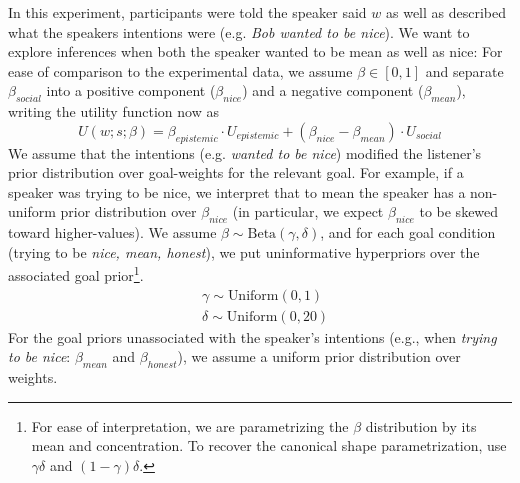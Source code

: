 \documentclass[10pt,letterpaper]{article}
\newcommand{\ndg}[1]{\textcolor{Green}{[ndg: #1]}}
\begin{document}
In this experiment, participants were told the speaker said $w$ as well as described what the speakers intentions were (e.g. \emph{Bob wanted to be nice}). 
We want to explore inferences when both the speaker wanted to be mean as well as nice: For ease of comparison to the experimental data, we assume $\beta \in [0,1]$ and separate $\beta_{social}$ into a positive component ($\beta_{nice}$) and a negative component ($\beta_{mean}$), writing the utility function now as
$$
 U(w;s; \beta)  =  \beta_{epistemic}\cdot U_{epistemic} + (\beta_{nice} - \beta_{mean}) \cdot U_{social}
 $$ 
We assume that the intentions (e.g. \emph{wanted to be nice}) modified the listener's prior distribution over goal-weights for the relevant goal. For example, if a speaker was trying to be nice, we interpret that to mean the speaker has a non-uniform prior distribution over $\beta_{nice}$ (in particular, we expect $\beta_{nice}$ to be skewed toward higher-values). 
We assume $\beta \sim \text{Beta}(\gamma, \delta)$, and for each goal condition (trying to be \emph{nice, mean, honest}), we put uninformative hyperpriors over the associated goal prior\footnote{For ease of interpretation, we are parametrizing the $\beta$ distribution by its mean and concentration. To recover the canonical shape parametrization, use $\gamma \delta$ and $(1-\gamma)\delta$.}.
%
\begin{eqnarray*}
& \gamma \sim  \text{Uniform}(0,1)\\
& \delta  \sim  \text{Uniform}(0, 20)
\end{eqnarray*}
For the goal priors unassociated with the speaker's intentions (e.g., when \emph{trying to be nice}: $\beta_{mean}$ and $\beta_{honest}$), we assume a uniform prior distribution over weights.
\end{document}
